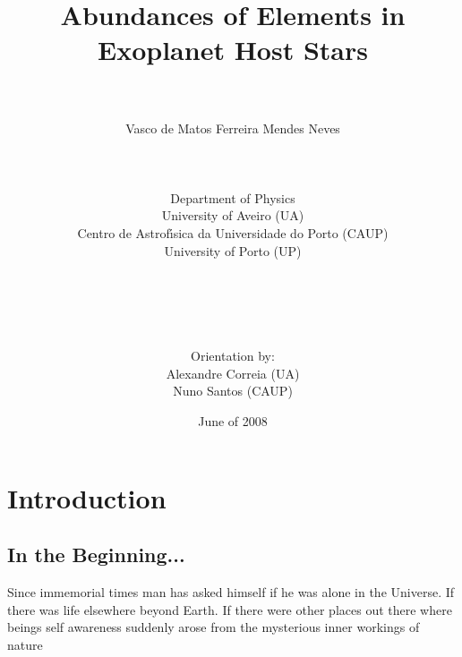 \documentclass[dvips,12pt,a4paper]{report}
\title{Abundances of Elements in Exoplanet Host Stars}
\author{\\
\\
Vasco de Matos Ferreira Mendes Neves \\ [4mm]
\\
\\
\\
Department of Physics \\
University of Aveiro (UA) \\
Centro de Astrof\'{\i}sica da Universidade do Porto (CAUP) \\
University of Porto (UP)
\\
\\
\\
\\
\\
\\
Orientation by:\\
Alexandre Correia (UA) \\ Nuno Santos (CAUP)}
\date{June of 2008}
\begin{document}
\maketitle
\newpage
{}
\tableofcontents
\newpage
{}


\chapter{Introduction}
\cfoot{ { \thepage} }
\pagestyle{fancy}
\section{In the Beginning...}

Since immemorial times man has asked himself if he was alone in the Universe. If there was life elsewhere beyond Earth. If there were other places out there where beings self awareness suddenly arose from the mysterious inner workings of nature
\end{document}
